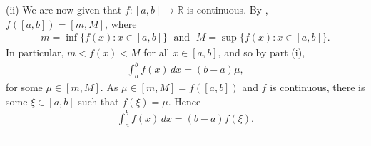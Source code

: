 \documentclass[letterpaper,10pt,english]{jupyterBook}
\begin{document}
\sphinxAtStartPar
(ii) We are now given that \(f:[a,b]\to\mathbb{R}\) is continuous. By , \(f([a,b])=[m,M]\), where
\begin{equation*}
\begin{split}
m = \inf \{ f(x) : x\in [a,b] \} \; \text{ and } \; M = \sup \{ f(x) : x\in [a,b] \}.
\end{split}
\end{equation*}
\sphinxAtStartPar
In particular, \(m<f(x)<M\) for all \(x\in[a,b]\), and so by part (i),
\begin{equation*}
\begin{split}
\int_a^b f(x)\, dx =(b-a)\mu,
\end{split}
\end{equation*}
\sphinxAtStartPar
for some \(\mu \in [m,M]\). As \(\mu\in [m,M]=f([a,b])\) and \(f\) is continuous, there is some \(\xi \in [a,b]\) such that \(f(\xi ) = \mu\). Hence
\begin{equation*}
\begin{split}
\int_a^b f(x)\, dx =(b-a)f(\xi ).
\end{split}
\end{equation*}

\bigskip\hrule\bigskip
\end{document}
